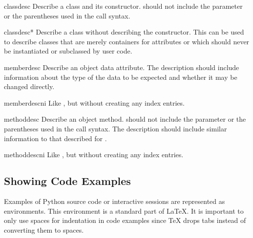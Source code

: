 \documentclass{howto}
\begin{document}
    \begin{envdesc}{classdesc}{}
      Describe a class and its constructor.   should not include the  parameter or
      the parentheses used in the call syntax.
    \end{envdesc}

    \begin{envdesc}{classdesc*}{}
      Describe a class without describing the constructor.  This can
      be used to describe classes that are merely containers for
      attributes or which should never be instantiated or subclassed
      by user code.
    \end{envdesc}

    \begin{envdesc}{memberdesc}{}
      Describe an object data attribute.  The description should
      include information about the type of the data to be expected
      and whether it may be changed directly.
    \end{envdesc}
    \begin{envdesc}{memberdescni}{}
      Like , but without creating any index entries.
    \end{envdesc}

    \begin{envdesc}{methoddesc}{}
      Describe an object method.   should not include
      the  parameter or the parentheses used in the call
      syntax.  The description should include similar information to
      that described for .
    \end{envdesc}
    \begin{envdesc}{methoddescni}{}
      Like , but without creating any index entries.
    \end{envdesc}


  \subsection{Showing Code Examples \label{showing-examples}}

    Examples of Python source code or interactive sessions are
    represented as  environments.  This environment
    is a standard part of \LaTeX{}.  It is important to only use
    spaces for indentation in code examples since \TeX{} drops tabs
    instead of converting them to spaces.
\end{document}
